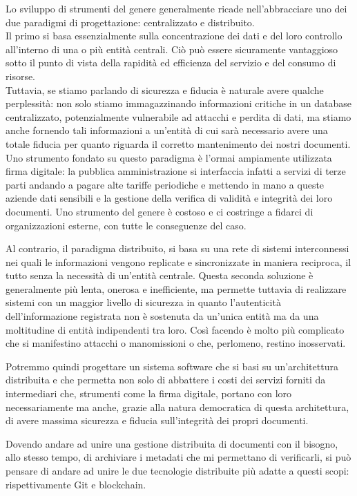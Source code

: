 Lo sviluppo di strumenti del genere generalmente ricade nell'abbracciare
uno dei due paradigmi di progettazione: centralizzato e distribuito.
\\
Il primo si basa essenzialmente sulla concentrazione dei dati e del loro controllo
all'interno di una o più entità centrali. Ciò può essere sicuramente vantaggioso sotto
il punto di vista della rapidità ed efficienza del servizio e del consumo di risorse.
\\
Tuttavia, se stiamo parlando di sicurezza e fiducia è naturale avere qualche perplessità:
non solo stiamo immagazzinando informazioni critiche in un database centralizzato,
potenzialmente vulnerabile ad attacchi e perdita di dati, ma stiamo anche fornendo
tali informazioni a un'entità di cui sarà necessario avere una totale fiducia per quanto
riguarda il corretto mantenimento dei nostri documenti.
\\
Uno strumento fondato su questo paradigma è l'ormai ampiamente utilizzata firma digitale:
la pubblica amministrazione si interfaccia infatti a servizi di terze parti andando a pagare
alte tariffe periodiche e mettendo in mano a queste aziende dati sensibili e la gestione della
verifica di validità e integrità dei loro documenti.
Uno strumento del genere è costoso e ci costringe a fidarci
di organizzazioni esterne, con tutte le conseguenze del caso.

Al contrario, il paradigma distribuito, si basa su una rete di sistemi interconnessi nei
quali le informazioni vengono replicate e sincronizzate in maniera reciproca, il tutto senza
la necessità di un'entità centrale. 
Questa seconda soluzione è generalmente più lenta, onerosa e inefficiente,
ma permette tuttavia di realizzare sistemi con un maggior livello di sicurezza in quanto
l'autenticità dell'informazione registrata non è sostenuta da un'unica entità ma da una
moltitudine di entità indipendenti tra loro.
Così facendo è molto più complicato che si manifestino attacchi o manomissioni
o che, perlomeno, restino inosservati.

Potremmo quindi progettare un sistema software che si basi su un'architettura distribuita
e che permetta non solo di abbattere i costi dei servizi forniti da intermediari che,
strumenti come la firma digitale, portano con loro necessariamente ma anche,
grazie alla natura democratica di questa architettura, di avere massima sicurezza
e fiducia sull'integrità dei propri documenti.

Dovendo andare ad unire una gestione distribuita di documenti con il bisogno, allo stesso 
tempo, di archiviare i metadati che mi permettano di verificarli, si può pensare di andare
ad unire le due tecnologie distribuite più adatte a questi scopi:
rispettivamente Git e blockchain.

